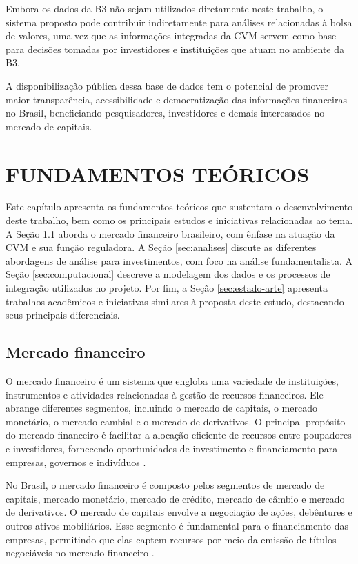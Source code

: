 \documentclass[recuosum=1.5cm]{iftex2024}
\begin{document}
Embora os dados da B3 não sejam utilizados diretamente neste trabalho, o sistema proposto pode contribuir indiretamente para análises relacionadas à bolsa de valores, uma vez que as informações integradas da CVM servem como base para decisões tomadas por investidores e instituições que atuam no ambiente da B3.

A disponibilização pública dessa base de dados tem o potencial de promover maior transparência, acessibilidade e democratização das informações financeiras no Brasil, beneficiando pesquisadores, investidores e demais interessados no mercado de capitais.


\chapter{FUNDAMENTOS TEÓRICOS}
Este capítulo apresenta os fundamentos teóricos que sustentam o desenvolvimento deste trabalho, bem como os principais estudos e iniciativas relacionadas ao tema. A Seção \ref{sec:mercado-financeiro} aborda o mercado financeiro brasileiro, com ênfase na atuação da CVM e sua função reguladora. A Seção \ref{sec:analises} discute as diferentes abordagens de análise para investimentos, com foco na análise fundamentalista. A Seção \ref{sec:computacional} descreve a modelagem dos dados e os processos de integração utilizados no projeto. Por fim, a Seção \ref{sec:estado-arte} apresenta trabalhos acadêmicos e iniciativas similares à proposta deste estudo, destacando seus principais diferenciais.

\section{Mercado financeiro} \label{sec:mercado-financeiro} %

O mercado financeiro é um sistema que engloba uma variedade de instituições, instrumentos e atividades relacionadas à gestão de recursos financeiros. Ele abrange diferentes segmentos, incluindo o mercado de capitais, o mercado monetário, o mercado cambial e o mercado de derivativos. O principal propósito do mercado financeiro é facilitar a alocação eficiente de recursos entre poupadores e investidores, fornecendo oportunidades de investimento e financiamento para empresas, governos e indivíduos \cite{teixeira:2019:mercado, damodaran:2012:investimentos}.

No Brasil, o mercado financeiro é composto pelos segmentos de mercado de capitais, mercado monetário, mercado de crédito, mercado de câmbio e mercado de derivativos. O mercado de capitais envolve a negociação de ações, debêntures e outros ativos mobiliários. Esse segmento é fundamental para o financiamento das empresas, permitindo que elas captem recursos por meio da emissão de títulos negociáveis no mercado financeiro \cite{reis:2021:negociacao}.
\end{document}

